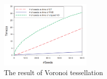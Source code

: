 \begin{itemize}
\begin{figure}[ht!]
        \centering
        \includegraphics[width=0.4\textwidth]{img/clipped}
        \caption{The result of Voronoi tessellation \cite{yan2010efficient}}
        \label{voro}
\end{figure}
\end{itemize}


